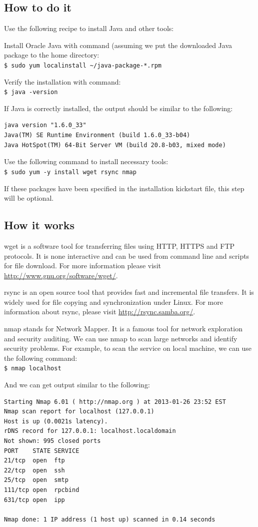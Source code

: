 \subsection*{How to do it}
Use the following recipe to install Java and other tools:

Install Oracle Java with command (assuming we put the downloaded Java package to the home directory: \\
\verb|$ sudo yum localinstall ~/java-package-*.rpm|

Verify the installation with command: \\
\verb|$ java -version|

If Java is correctly installed, the output should be similar to the following:
\lstset{style=bashstyle}
\begin{lstlisting}
java version "1.6.0_33"
Java(TM) SE Runtime Environment (build 1.6.0_33-b04)
Java HotSpot(TM) 64-Bit Server VM (build 20.8-b03, mixed mode)
\end{lstlisting}

Use the following command to install necessary tools: \\
\verb|$ sudo yum -y install wget rsync nmap|

If these packages have been specified in the installation kickstart file, this step will be optional.

\subsection*{How it works}
wget\emph{} is a software tool for transferring files using HTTP, HTTPS and FTP protocols. It is none interactive and can be used from command line and scripts for file download. For more information please visit \href{http://www.gnu.org/software/wget/}{http://www.gnu.org/software/wget/}.

rsync\emph{} is an open source tool that provides fast and incremental file transfers. It is widely used for file copying and synchronization under Linux. For more information about rsync, please visit \url{http://rsync.samba.org/}.

nmap\emph{} stands for Network Mapper. It is a famous tool for network exploration and security auditing. We can use nmap to scan large networks and identify security problems. For example, to scan the service on local machine, we can use the following command:\\
\verb|$ nmap localhost|

And we can get output similar to the following:
\lstset{style=bashstyle}
\begin{lstlisting}
Starting Nmap 6.01 ( http://nmap.org ) at 2013-01-26 23:52 EST
Nmap scan report for localhost (127.0.0.1)
Host is up (0.0021s latency).
rDNS record for 127.0.0.1: localhost.localdomain
Not shown: 995 closed ports
PORT    STATE SERVICE
21/tcp  open  ftp
22/tcp  open  ssh
25/tcp  open  smtp
111/tcp open  rpcbind
631/tcp open  ipp

Nmap done: 1 IP address (1 host up) scanned in 0.14 seconds
\end{lstlisting}

